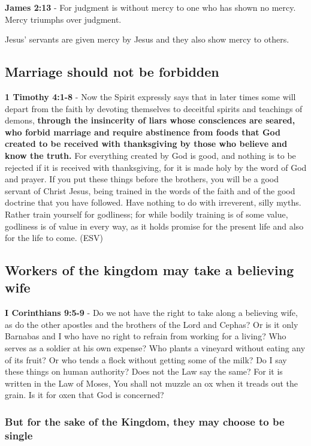 \documentclass[11pt]{article}
\begin{document}
\textbf{James 2:13} - For judgment is without mercy to one who has shown no mercy. Mercy triumphs over judgment.

Jesus' servants are given mercy by Jesus and they also show mercy to others.

\subsection{Marriage should not be forbidden}
\label{sec:org8d280fe}
\textbf{1 Timothy 4:1-8} - Now the Spirit expressly says that in later times some will depart from the faith by devoting themselves to deceitful spirits and teachings of demons, \textbf{through the insincerity of liars whose consciences are seared, who forbid marriage and require abstinence from foods that God created to be received with thanksgiving by those who believe and know the truth.} For everything created by God is good, and nothing is to be rejected if it is received with thanksgiving, for it is made holy by the word of God and prayer. If you put these things before the brothers, you will be a good servant of Christ Jesus, being trained in the words of the faith and of the good doctrine that you have followed. Have nothing to do with irreverent, silly myths. Rather train yourself for godliness; for while bodily training is of some value, godliness is of value in every way, as it holds promise for the present life and also for the life to come. (ESV)

\subsection{Workers of the kingdom may take a believing wife}
\label{sec:org7364784}
\textbf{I Corinthians 9:5-9} - Do we not have the right to take along a believing wife, as do the other apostles and the brothers of the Lord and Cephas? Or is it only Barnabas and I who have no right to refrain from working for a living? Who serves as a soldier at his own expense? Who plants a vineyard without eating any of its fruit? Or who tends a flock without getting some of the milk? Do I say these things on human authority? Does not the Law say the same? For it is written in the Law of Moses, You shall not muzzle an ox when it treads out the grain. Is it for oxen that God is concerned?

\subsubsection{But for the sake of the Kingdom, they may choose to be single}
\label{sec:orgfa7b929}
\end{document}
